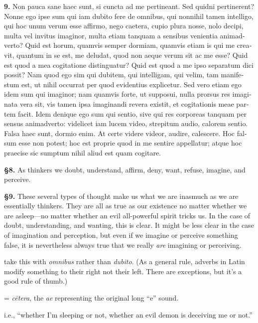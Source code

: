 \beginnumbering
\pstart
\begin{latin}
    \textenglish{\textbf{9.}} Non pauca sane haec sunt, si cuncta ad me pertineant. Sed quidni pertinerent? Nonne ego ipse sum qui iam dubito fere de omnibus, qui nonnihil tamen intelligo, qui hoc unum verum esse affirmo, nego caetera, cupio plura nosse, nolo decipi, multa vel invitus imaginor, multa etiam tanquam a sensibus venientia animadverto? Quid est horum, quamvis semper dormiam, quamvis etiam is qui me creavit, quantum in se est, me deludat, quod non aeque verum sit ac me esse? Quid est quod a mea cogitatione distinguatur? Quid est quod a me ipso separatum dici possit? Nam quod ego sim qui dubitem, qui intelligam, qui velim, tam manifestum est, ut nihil occurrat per quod evidentius explicetur. Sed vero etiam ego idem sum qui imaginor; nam quamvis forte, ut supposui, nulla prorsus res imaginata vera sit, vis tamen ipsa imaginandi revera existit, et cogitationis meae partem facit. Idem denique ego sum qui sentio, sive qui res corporeas tanquam per sensus animadverto: videlicet iam lucem video, strepitum audio, calorem sentio. Falsa haec sunt, dormio enim. At certe videre videor, audire, calescere. Hoc falsum esse non potest; hoc est proprie quod in me sentire appellatur; atque hoc praecise sic sumptum nihil aliud est quam cogitare.
\end{latin}
\pend
\endnumbering

\prenotes

\textbf{§8.} As thinkers we doubt, understand, affirm, deny, want, refuse, imagine, and perceive.

\textbf{§9.} These several types of thought make us what we are inasmuch as we are essentially thinkers. They are all as true as our existence no matter whether we are asleep---no matter whether an evil all-powerful spirit tricks us. In the case of doubt, understanding, and wanting, this is clear. It might be less clear in the case of imagination and perception, but even if we imagine or perceive something false, it is nevertheless always true that we really \textit{are} imagining or perceiving.

 take this with \textit{omnibus} rather than \textit{dubito}. (As a general rule, adverbs in Latin modify something to their right not their left. There are exceptions, but it's a good rule of thumb.)

 = \textit{cētera}, the \textit{ae} representing the original long ``e'' sound.

 i.e., ``whether I'm sleeping or not, whether an evil demon is deceiving me or not.''

